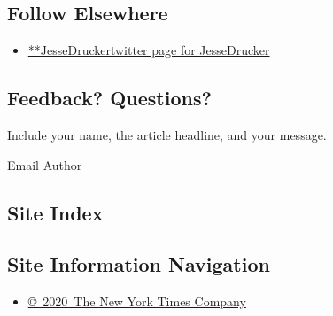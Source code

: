 \hypertarget{follow-elsewhere}{%
\subsection{Follow Elsewhere}\label{follow-elsewhere}}

\begin{itemize}
\tightlist
\item
  \href{https://twitter.com/JesseDrucker}{**JesseDruckertwitter page for
  JesseDrucker}
\end{itemize}

\hypertarget{feedback-questions}{%
\subsection{Feedback? Questions?}\label{feedback-questions}}

Include your name, the article headline, and your message.

Email Author

\hypertarget{site-index}{%
\subsection{Site Index}\label{site-index}}

\hypertarget{site-information-navigation}{%
\subsection{Site Information
Navigation}\label{site-information-navigation}}

\begin{itemize}
\tightlist
\item
  \href{https://help.nytimes3xbfgragh.onion/hc/en-us/articles/115014792127-Copyright-notice}{©~2020~The
  New York Times Company}
\end{itemize}

